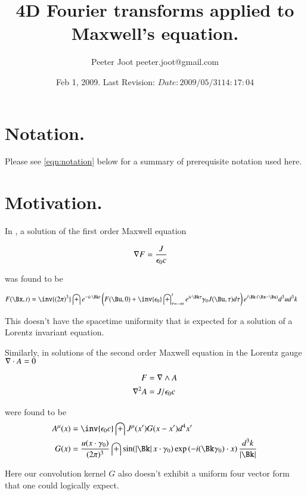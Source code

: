 \documentclass{article}
\title{ 4D Fourier transforms applied to Maxwell's equation. }
\author{Peeter Joot \quad peeter.joot@gmail.com}
\date{ Feb 1, 2009.  Last Revision: $Date: 2009/05/31 14:17:04 $ }
\begin{document}
\maketitle{}
\tableofcontents

\section{ Notation. }

Please see \ref{eqn:notation} below for a summary of prerequisite notation used here.

\section{ Motivation. }

In \cite{PJfirstOrderMaxwell}, a solution of the first order Maxwell equation

\begin{align}
\nabla F &= \frac{J }{\epsilon_0 c}
\end{align}

was found to be

\begin{align}
F(\Bx,t) 
&=
\inv{({2\pi})^3} \int 
e^{-i c \Bk t}
\left(
F(\Bu, 0) + \inv{\epsilon_0} \int_{\tau = -\infty}^{t} e^{i c \Bk \tau } \gamma_0 J(\Bu,\tau)  d\tau  
\right)
e^{i \Bk \cdot (\Bx-\Bu)} 
d^3 u
d^3 k
\end{align}

This doesn't have the spacetime uniformity that is expected for a solution of a Lorentz invariant equation.

Similarly, in \cite{PJfourierMaxwellSecondOrder} solutions of the second order Maxwell equation in the Lorentz gauge
$\nabla \cdot A = 0$ 

\begin{align*}
F &= \nabla \wedge A \\
\nabla^2 A &= J/\epsilon_0 c
\end{align*}

were found to be
\begin{align}\label{eqn:fourVectorPotentials}
{A^\mu}(x)
&= \inv{\epsilon_0 c} \int J^\mu(x') G(x - x') d^4 x' \\
G(x)
&= 
\frac{u(x \cdot \gamma_0)}{ (2\pi)^3 }
\int
\sin( \Abs{\Bk} x \cdot \gamma_0 )
\exp\left( -i (\Bk \gamma_0) \cdot x \right)
\frac{d^3 k}{ \Abs{\Bk} }
\end{align}

Here our convolution kernel $G$ also doesn't exhibit a uniform four vector form that one could logically expect.
\end{document}
